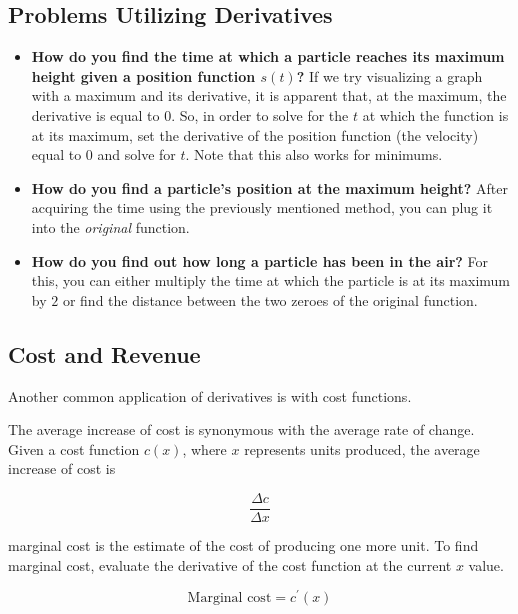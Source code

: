 \subsection{Problems Utilizing Derivatives}

\begin{itemize}
    \item \textbf{How do you find the time at which a particle reaches its maximum height given a position function \( s \left( t \right) \)?} If we try visualizing a graph with a maximum and its derivative, it is apparent that, at the maximum, the derivative is equal to \( 0 \). So, in order to solve for the \( t \) at which the function is at its maximum, set the derivative of the position function (the velocity) equal to \( 0 \) and solve for \( t \). Note that this also works for minimums.

    \item \textbf{How do you find a particle's position at the maximum height?} After acquiring the time using the previously mentioned method, you can plug it into the \textit{original} function.

    \item \textbf{How do you find out how long a particle has been in the air?} For this, you can either multiply the time at which the particle is at its maximum by \( 2 \) or find the distance between the two zeroes of the original function.
\end{itemize}

\subsection{Cost and Revenue}

Another common application of derivatives is with cost functions.

The average increase of cost is synonymous with the average rate of change. Given a cost function \( c \left( x \right) \), where \( x \) represents units produced, the average increase of cost is

\[ \dfrac{\Delta c}{\Delta x} \]

\begin{definition}{marginal cost}
     is the estimate of the cost of producing one more unit. To find marginal cost, evaluate the derivative of the cost function at the current \( x \) value.

    \[ \text{Marginal cost} = c^\prime \left( x \right) \]
\end{definition}

